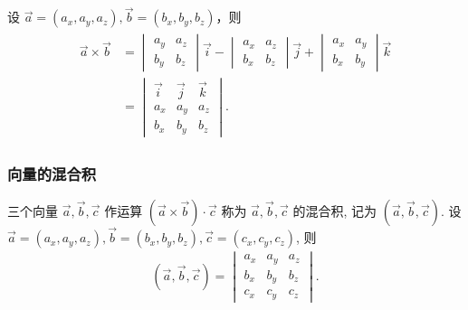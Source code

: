 设 $\vec{a}=\left(a_x, a_y, a_z\right), \vec{b}=\left(b_x, b_y, b_z\right)$，则
\begin{align*}
	\begin{aligned}
		\vec{a} \times \vec{b} & =\begin{vmatrix}
			                          a_y & a_z \\
			                          b_y & b_z
		                          \end{vmatrix} \vec{i}-\begin{vmatrix}
			                                                a_x & a_z \\
			                                                b_x & b_z
		                                                \end{vmatrix} \vec{j}+\begin{vmatrix}
			                                                                      a_x & a_y \\
			                                                                      b_x & b_y
		                                                                      \end{vmatrix} \vec{k} \\
		                       & =\begin{vmatrix}
			                          \vec{i} & \vec{j} & \vec{k} \\
			                          a_x     & a_y     & a_z     \\
			                          b_x     & b_y     & b_z
		                          \end{vmatrix} .
	\end{aligned}
\end{align*}

\subsubsection{向量的混合积}
三个向量 $\vec{a} , \vec{b} , \vec{c}$ 作运算 $(\vec{a} \times \vec{b}) \cdot \vec{c}$ 称为 $\vec{a} , \vec{b} , \vec{c}$ 的混合积, 记为 $(\vec{a}, \vec{b}, \vec{c})$.
设 $\vec{a}=\left(a_x, a_y, a_z\right), \vec{b}=\left(b_x, b_y, b_z\right), \vec{c}=\left(c_x, c_y, c_z\right)$, 则
\begin{align*}
	(\vec{a}, \vec{b}, \vec{c})=\begin{vmatrix}
		                            a_x & a_y & a_z \\
		                            b_x & b_y & b_z \\
		                            c_x & c_y & c_z
	                            \end{vmatrix} .
\end{align*}

